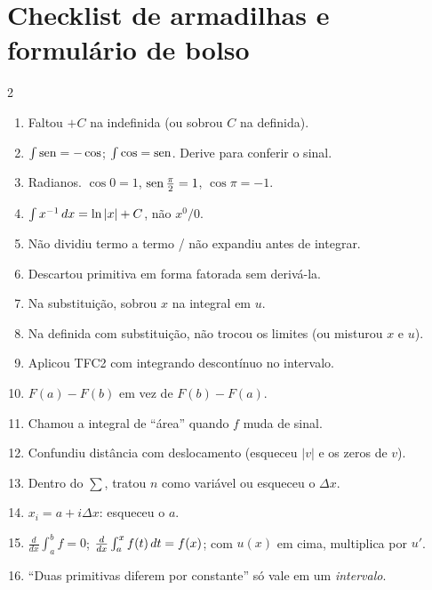 \newpage
\section{Checklist de armadilhas e formulário de bolso}

\begin{armadilha}
\begin{multicols}{2}
\begin{enumerate}[leftmargin=1.5em, itemsep=1pt]
\item Faltou $+C$ na indefinida (ou sobrou $C$ na definida).
\item $\int\operatorname{sen}=-\cos$; $\int\cos=\operatorname{sen}$. Derive para conferir o sinal.
\item Radianos. $\cos0=1$, $\operatorname{sen}\frac\pi2=1$, $\cos\pi=-1$.
\item $\int x^{-1}\,dx=\ln|x|+C$, não $x^0/0$.
\item Não dividiu termo a termo / não expandiu antes de integrar.
\item Descartou primitiva em forma fatorada sem derivá-la.
\item Na substituição, sobrou $x$ na integral em $u$.
\item Na definida com substituição, não trocou os limites (ou misturou $x$ e $u$).
\item Aplicou TFC2 com integrando descontínuo no intervalo.
\item $F(a)-F(b)$ em vez de $F(b)-F(a)$.
\item Chamou a integral de ``área'' quando $f$ muda de sinal.
\item Confundiu distância com deslocamento (esqueceu $|v|$ e os zeros de $v$).
\item Dentro do $\sum$, tratou $n$ como variável ou esqueceu o $\Delta x$.
\item $x_i=a+i\Delta x$: esqueceu o $a$.
\item $\frac{d}{dx}\int_a^b f=0$; $\frac{d}{dx}\int_a^x f(t)\,dt=f(x)$; com $u(x)$ em cima, multiplica por $u'$.
\item ``Duas primitivas diferem por constante'' só vale em um \emph{intervalo}.
\end{enumerate}
\end{multicols}
\end{armadilha}

